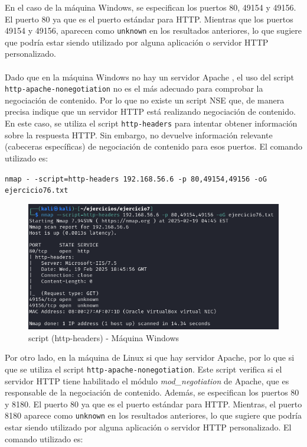 \documentclass[a4paper,12pt]{article} %
\begin{document}
En el caso de la máquina Windows, se especifican los puertos 80, 49154 y 49156. El puerto 80 ya que es el puerto estándar para HTTP. Mientras que los puertos 49154 y 49156,  aparecen como \texttt{unknown} en los resultados anteriores, lo que sugiere que podría estar siendo utilizado por alguna aplicación o servidor HTTP personalizado. 
\\ \\
    Dado que en la máquina Windows no hay un servidor Apache , el uso del script  \\ \texttt{http-apache-nonegotiation} no es el más adecuado para comprobar la negociación de contenido. Por lo que no existe un script NSE que, de manera precisa indique que un servidor HTTP está realizando negociación de contenido. En este caso, se utiliza el script \texttt{http-headers} para intentar obtener información sobre la respuesta HTTP. Sin embargo, no devuelve información relevante (cabeceras específicas) de negociación de contenido para esos puertos. El comando utilizado es: 
        \begin{center}
        \texttt{nmap - -script=http-headers 192.168.56.6 -p 80,49154,49156 -oG ejercicio76.txt}
        \end{center}

        
        \begin{figure} [hp!]
         \centering
         \includegraphics[width=1\textwidth]{Imagenes/httpheaders.png}
         \caption{script (http-headers) - Máquina Windows}
         \label{fig:eje6Linux}
        \end{figure}

Por otro lado, en la máquina de Linux si que hay servidor Apache, por lo que si que se utiliza el script \texttt{http-apache-nonegotiation}. Este script verifica si el servidor HTTP tiene habilitado el módulo \textit{mod\_negotiation} de Apache, que es responsable de la negociación de contenido. Además, se especifican los puertos 80 y 8180. El puerto 80 ya que es el puerto estándar para HTTP. Mientras, el puerto 8180 aparece como \texttt{unknown} en los resultados anteriores, lo que sugiere que podría estar siendo utilizado por alguna aplicación o servidor HTTP personalizado. El comando utilizado es:
\end{document}
